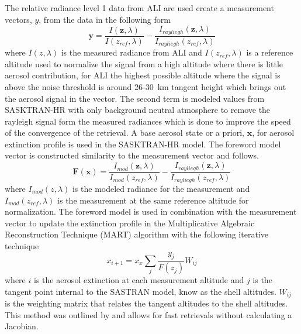 \documentclass[12pt]{article}
\begin{document}
The relative radiance level 1 data from ALI are used create a measurement vectors, $y$, from the data in the following form
\begin{equation}
    \mathbf{y} = \frac{I(\mathbf{z},\lambda)}{I(z_{ref},\lambda)}-\frac{I_{rayliegh}(\mathbf{z},\lambda)}{I_{rayliegh}(z_{ref},\lambda)}
    \label{eqn:measurementVector}
\end{equation}
where $I(z,\lambda)$ is the measured radiance from ALI and $I(z_{ref},\lambda)$ is a reference altitude used to normalize the signal from a high altitude where there is little aerosol contribution, for ALI the highest possible altitude where the signal is above the noise threshold is around 26-30~km tangent height which brings out the aerosol signal in the vector. The second term is modeled values from SASKTRAN-HR with only background neutral atmosphere to remove the rayleigh signal form the measured radiances which is done to improve the speed of the convergence of the retrieval. A base aerosol state or a priori, $\mathbf{x}$, for aerosol extinction profile is used in the SASKTRAN-HR model. The foreword model vector is constructed similarity to the measurement vector and follows.
\begin{equation}
    \mathbf{F}(\mathbf{x}) = \frac{I_{mod}(\mathbf{z},\lambda)}{I_{mod}(z_{ref},\lambda)}-\frac{I_{rayliegh}(\mathbf{z},\lambda)}{I_{rayliegh}(z_{ref},\lambda)}
    \label{eqn:forewordModel}
\end{equation}
where $I_{mod}(z,\lambda)$ is the modeled radiance for the measurement and $I_{mod}(z_{ref},\lambda)$ is the measurement at the same reference altitude for normalization. The foreword model is used in combination with the measurement vector to update the extinction profile in the Multiplicative Algebraic Reconstruction Technique (MART) algorithm with the following iterative technique
\begin{equation}
    x_{i+1} = x_{x}\sum_{j}\frac{y_{j}}{F(z_{j})}W_{ij}
\end{equation}
where $i$ is the aerosol extinction at each measurement altitude and $j$ is the tangent point internal to the SASTRAN model, know as the shell altitudes. $W_{ij}$ is the weighting matrix that relates the tangent altitudes to the shell altitudes. This method was outlined by \cite{Degenstein2009} and allows for fast retrievals without calculating a Jacobian.
\end{document}
